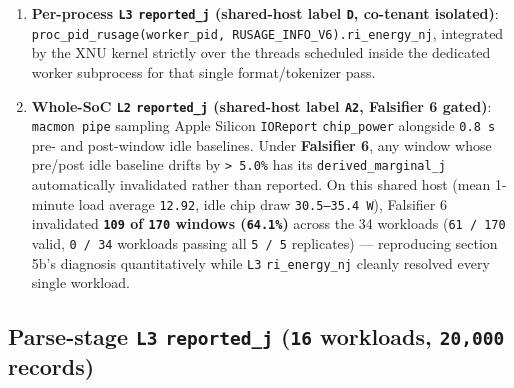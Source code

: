 \documentclass[10pt,letterpaper]{article}
\providecommand{\tightlist}{\setlength{\itemsep}{1pt}\setlength{\parskip}{0pt}}
\begin{document}
\begin{enumerate}
\def\labelenumi{\arabic{enumi}.}
\tightlist
\item
  \textbf{Per-process \texttt{L3} \texttt{reported\_j} (shared-host
  label \texttt{D}, co-tenant isolated)}:
  \texttt{proc\_\allowbreak{}pid\_\allowbreak{}rusage(\allowbreak{}worker\_\allowbreak{}pid,\allowbreak{}\ RUSAGE\_\allowbreak{}INFO\_\allowbreak{}V6).\allowbreak{}ri\_\allowbreak{}energy\_\allowbreak{}nj},
  integrated by the XNU kernel strictly over the threads scheduled
  inside the dedicated worker subprocess for that single
  format/tokenizer pass.
\item
  \textbf{Whole-SoC \texttt{L2} \texttt{reported\_j} (shared-host label
  \texttt{A2}, Falsifier 6 gated)}: \texttt{macmon\ pipe} sampling Apple
  Silicon \texttt{IOReport} \texttt{chip\_power} alongside
  \texttt{0.8\ s} pre- and post-window idle baselines. Under
  \textbf{Falsifier 6}, any window whose pre/post idle baseline drifts
  by \texttt{\textgreater{}\ 5.0\%} has its
  \texttt{derived\_\allowbreak{}marginal\_\allowbreak{}j} automatically invalidated rather than
  reported. On this shared host (mean 1-minute load average
  \texttt{12.92}, idle chip draw \texttt{30.5–35.4\ W}), Falsifier 6
  invalidated \textbf{\texttt{109} of \texttt{170} windows
  (\texttt{64.1\%})} across the 34 workloads (\texttt{61\ /\ 170} valid,
  \texttt{0\ /\ 34} workloads passing all \texttt{5\ /\ 5} replicates)
  --- reproducing section 5b's diagnosis quantitatively while
  \texttt{L3} \texttt{ri\_energy\_nj} cleanly resolved every single
  workload.
\end{enumerate}

\subsection{\texorpdfstring{Parse-stage \texttt{L3} \texttt{reported\_j}
(\texttt{16} workloads, \texttt{20,000}
records)}{Parse-stage L3 reported\_j (16 workloads, 20,000 records)}}\label{parse-stage-l3-reported_j-16-workloads-20000-records}
\end{document}
